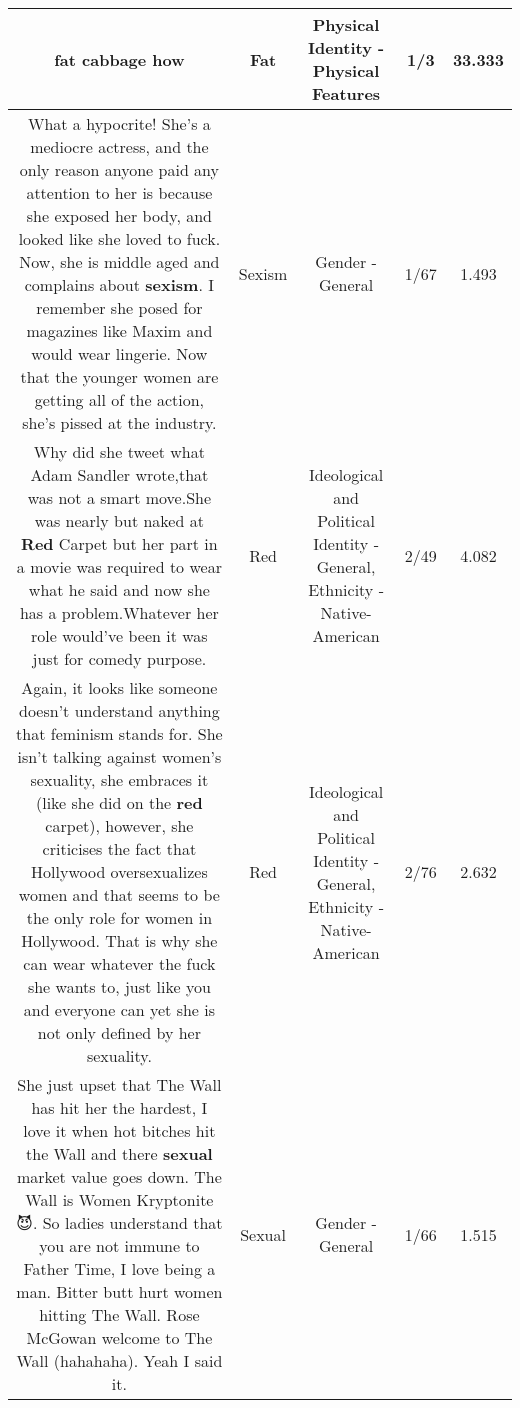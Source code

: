 \documentclass[11pt]{article}
\newlength\mylength
\begin{document}
\begin{center}
\begin{longtable}{|C{.65\mylength}|C{.30\mylength}|C{.12\mylength}|C{.12\mylength}|C{.12\mylength}|}
  \small fat cabbage how\normalsize   & Fat & Physical Identity - Physical Features & 1/3 & 33.333 \\  \hline
  \small What a hypocrite! She's a mediocre actress, and the only reason anyone paid any attention to her is because she exposed her body, and looked like she loved to fuck. Now, she is middle aged and complains about \textbf{sexism}. I remember she posed for magazines like Maxim and would wear lingerie. Now that the younger women are getting all of the action, she's pissed at the industry.\normalsize   & Sexism & Gender - General & 1/67 & 1.493 \\  \hline
  \small Why did she tweet what Adam Sandler wrote,that was not a smart move.She was nearly but naked at \textbf{R\textbf{ed}} Carpet but her part in a movie was required to wear what he said and now she has a problem.Whatever her role would've been it was just for comedy purpose.\normalsize   & Red &  Ideological and Political Identity - General, Ethnicity - Native-American & 2/49 & 4.082 \\  \hline
  \small Again, it looks like someone doesn't understand anything that feminism stands for. She isn't talking against women's sexuality, she embraces it (like she did on the \textbf{r\textbf{ed}} carpet), however, she criticises the fact that Hollywood oversexualizes women and that seems to be the only role for women in Hollywood. That is why she can wear whatever the fuck she wants to, just like you and everyone can yet she is not only defined by her sexuality.\normalsize   & Red &  Ideological and Political Identity - General, Ethnicity - Native-American & 2/76 & 2.632 \\  \hline
  \small She just upset that The Wall has hit her the hardest, I love it when hot bitches hit the Wall and there \textbf{sexual} market value goes down. The Wall is Women Kryptonite😈. So ladies understand that you are not immune to Father Time, I love being a man. Bitter butt hurt women hitting The Wall. Rose McGowan welcome to The Wall (hahahaha). Yeah I said it.\normalsize   & Sexual & Gender - General & 1/66 & 1.515 \\  \hline

\end{longtable}
\end{center}
\end{document}
